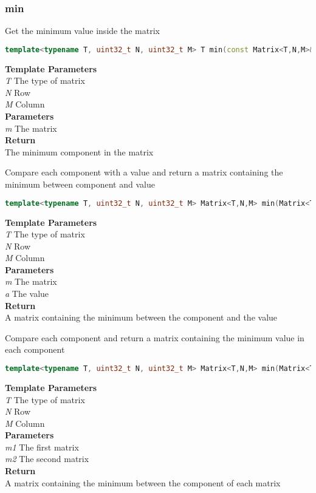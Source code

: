 \subsubsection{min}
\begin{mdframed}
Get the minimum value inside the matrix
\begin{lstlisting}[language=C++]
template<typename T, uint32_t N, uint32_t M> T min(const Matrix<T,N,M>& m) 
\end{lstlisting}
\textbf{Template Parameters} \\ 
\textit{T} The type of matrix \\ 
\textit{N} Row \\ 
\textit{M} Column \\ 
\textbf{Parameters} \\ 
\textit{m} The matrix \\ 
\textbf{Return} \\ 
The minimum component in the matrix\\ 
\end{mdframed}

\begin{mdframed}
Compare each component with a value and return a matrix containing the minimum between component and value
\begin{lstlisting}[language=C++]
template<typename T, uint32_t N, uint32_t M> Matrix<T,N,M> min(Matrix<T,N,M> m, T a) 
\end{lstlisting}
\textbf{Template Parameters} \\ 
\textit{T} The type of matrix \\ 
\textit{N} Row \\ 
\textit{M} Column \\ 
\textbf{Parameters} \\ 
\textit{m} The matrix \\ 
\textit{a} The value \\ 
\textbf{Return} \\ 
A matrix containing the minimum between the component and the value\\ 
\end{mdframed}

\begin{mdframed}
Compare each component and return a matrix containing the minimum value in each component
\begin{lstlisting}[language=C++]
template<typename T, uint32_t N, uint32_t M> Matrix<T,N,M> min(Matrix<T,N,M> m1, const Matrix<T,N,M>& m2) 
\end{lstlisting}
\textbf{Template Parameters} \\ 
\textit{T} The type of matrix \\ 
\textit{N} Row \\ 
\textit{M} Column \\ 
\textbf{Parameters} \\ 
\textit{m1} The first matrix \\ 
\textit{m2} The second matrix \\ 
\textbf{Return} \\ 
A matrix containing the minimum between the component of each matrix\\ 
\end{mdframed}

